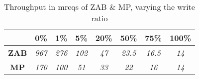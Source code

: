 
\begin{table}[t]
\centering
\begin{tabular}{c|c|c|c|c|c|c|c|}
\hhline{~-------}
\textbf{}                                                               
& 
 \textbf
{0\%} &
 \textbf
{1\%} &
 \textbf
{5\%} &
 \textbf
{20\%}&
 \textbf
{50\%}&
 \textbf
{75\%}&
 \textbf
{100\%}
\\ \hline
\multicolumn{1}{|c|}{
\textbf{ZAB}} & 
\textit{967} & 
\textit{276}  &
\textit{102}  & 
\textit{47}  & 
\textit{23.5}  & 
\textit{16.5}  & 
\textit{14}  
\\ \hline
\multicolumn{1}{|c|}{
\textbf{MP}} & 
\textit{170} & 
\textit{100}  &
\textit{51}  & 
\textit{33}  & 
\textit{22}  & 
\textit{16}  & 
\textit{14}  
\\ \hline
\end{tabular}%
\caption{Throughput in mreqs of ZAB \& MP, varying the write ratio}%
\label{tab:zab-perf}
\end{table}